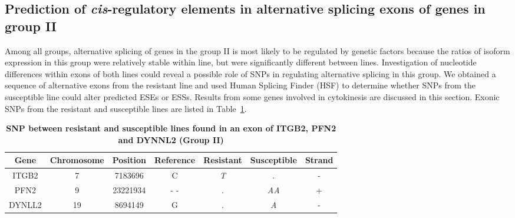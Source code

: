 \subsection{Prediction of {\em cis}-regulatory elements in
alternative splicing exons of genes in group II}

Among all groups, alternative splicing of genes in the group II is
most likely to be regulated by genetic factors because the ratios of
isoform expression in this group were relatively stable within line,
but were significantly different between lines.  Investigation of
nucleotide differences within exons of both lines could reveal a
possible role of SNPs in regulating alternative splicing in this
group.  We obtained a sequence of alternative exons from the
resistant line and used Human Splicing Finder (HSF) to determine
whether SNPs from the susceptible line could alter predicted ESEs or
ESSs.  Results from some genes involved in cytokinesis are discussed
in this section.  Exonic SNPs from the resistant and susceptible lines
are listed in Table~\ref{tab:deu_snps}.

\begin{table}[!ht]
\caption{
\textbf{SNP between resistant and susceptible lines found in an
exon of ITGB2, PFN2 and DYNNL2 (Group II)}}
\begin{center}
\begin{tabular}{ccccccc}
\hline
Gene &  Chromosome & Position & Reference & Resistant & Susceptible & Strand \\
\hline
ITGB2 & 7 & 7183696 & C & {\em T} & . & - \\
PFN2 & 9 & 23221934 & -  - & . & {\em AA} & + \\
DYNLL2 & 19 & 8694149 & G & . & {\em A} & - \\
\hline
\end{tabular}
\end{center}
\begin{flushleft}
\end{flushleft}
\label{tab:deu_snps}
\end{table}


